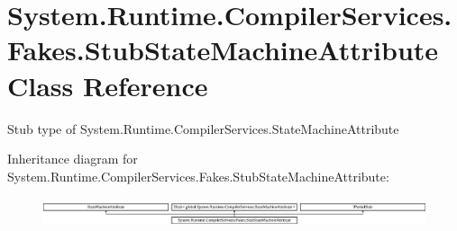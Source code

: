 \hypertarget{class_system_1_1_runtime_1_1_compiler_services_1_1_fakes_1_1_stub_state_machine_attribute}{\section{System.\-Runtime.\-Compiler\-Services.\-Fakes.\-Stub\-State\-Machine\-Attribute Class Reference}
\label{class_system_1_1_runtime_1_1_compiler_services_1_1_fakes_1_1_stub_state_machine_attribute}
}


Stub type of System.\-Runtime.\-Compiler\-Services.\-State\-Machine\-Attribute 


Inheritance diagram for System.\-Runtime.\-Compiler\-Services.\-Fakes.\-Stub\-State\-Machine\-Attribute\-:\begin{figure}[H]
\begin{center}
\leavevmode
\includegraphics[height=0.868217cm]{class_system_1_1_runtime_1_1_compiler_services_1_1_fakes_1_1_stub_state_machine_attribute}
\end{center}
\end{figure}
